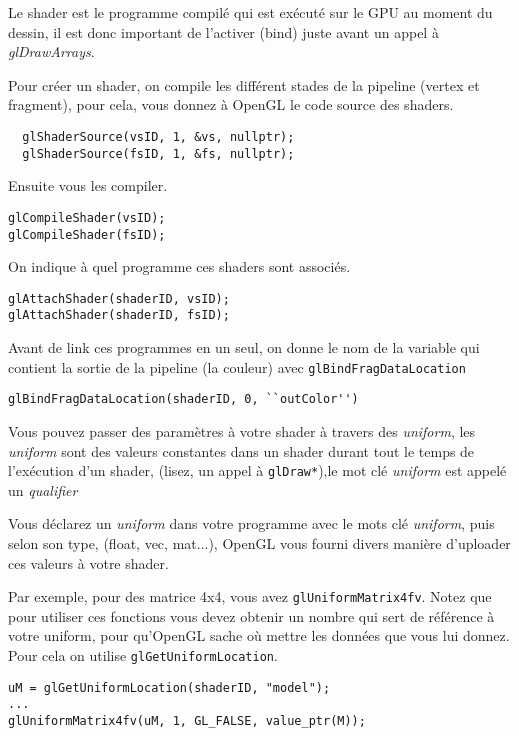 \documentclass[pdftex, 11pt, a4paper, titlepage]{article}
\begin{document}
Le shader est le programme compilé qui est exécuté sur le GPU au
moment du dessin, il est donc important de l'activer (bind) juste
avant un appel à \emph{glDrawArrays}.

Pour créer un shader, on compile les différent stades de la pipeline
(vertex et fragment), pour cela, vous donnez à OpenGL le code source
des shaders.
\begin{lstlisting}
  glShaderSource(vsID, 1, &vs, nullptr);
  glShaderSource(fsID, 1, &fs, nullptr);
\end{lstlisting}

Ensuite vous les compiler.

\begin{lstlisting}
glCompileShader(vsID);
glCompileShader(fsID);
\end{lstlisting}

On indique à quel programme ces shaders sont associés.

\begin{lstlisting}
glAttachShader(shaderID, vsID);
glAttachShader(shaderID, fsID);
\end{lstlisting}

Avant de link ces programmes en un seul, on donne le nom de la
variable qui contient la sortie de la pipeline (la couleur) avec
\texttt{glBindFragDataLocation}

\begin{lstlisting}
glBindFragDataLocation(shaderID, 0, ``outColor'')
\end{lstlisting}

Vous pouvez passer des paramètres à votre shader à travers des
\emph{uniform}, les \emph{uniform} sont des valeurs constantes 
dans un shader durant tout le temps de l'exécution d'un shader,
 (lisez, un appel à \texttt{glDraw*}),le mot clé \emph{uniform} 
est appelé un \textit{qualifier}

Vous déclarez un \emph{uniform} dans votre programme avec le mots clé
\emph{uniform}, puis selon son type, (float, vec, mat...), OpenGL vous fourni
divers manière d'uploader ces valeurs à votre shader.

Par exemple, pour des matrice 4x4, vous avez
\texttt{glUniformMatrix4fv}.  Notez que pour utiliser ces fonctions
vous devez obtenir un nombre qui sert de référence à votre uniform,
pour qu'OpenGL sache où mettre les données que vous lui donnez. Pour
cela on utilise \texttt{glGetUniformLocation}.

\begin{lstlisting}
uM = glGetUniformLocation(shaderID, "model");
...
glUniformMatrix4fv(uM, 1, GL_FALSE, value_ptr(M));
\end{lstlisting}
\end{document}

